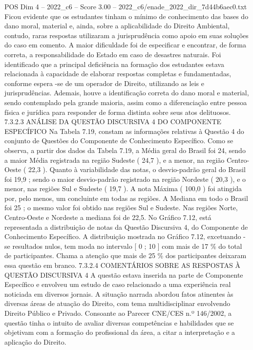 \begin{textsample}{POS Dim 4 – 2022\_c6 – Score 3.00 – 2022\_c6/enade\_2022\_dir\_7d44b6aec0.txt}
Ficou evidente que os estudantes tinham o mínimo de conhecimento das bases do dano moral, material e, ainda, sobre a aplicabilidade do Direito Ambiental, contudo, raras respostas utilizaram a jurisprudência como apoio em suas soluções do caso em comento.
A maior dificuldade foi de especificar e encontrar, de forma correta, a responsabilidade do Estado em caso de desastres naturais.
Foi identificado que a principal deficiência na formação dos estudantes estava relacionada à capacidade de elaborar respostas completas e fundamentadas, conforme espera -se de um operador de Direito, utilizando as leis e jurisprudências.
Ademais, houve a identificação correta do dano moral e material, sendo contemplado pela grande maioria, assim como a diferenciação entre pessoa física e jurídica para responder de forma distinta sobre seus atos delituosos. 7.3.2.3 ANÁLISE DA QUESTÃO DISCURSIVA 4 DO COMPONENTE ESPECÍFICO Na Tabela 7.19, constam as informações relativas à Questão 4 do conjunto de Questões do Componente de Conhecimento Específico.
Como se observa, a partir dos dados da Tabela 7.19, a Média geral do Brasil foi 24, sendo a maior Média registrada na região Sudeste ( 24,7 ), e a menor, na região Centro-Oeste ( 22,3 ).
Quanto à variabilidade das notas, o desvio-padrão geral do Brasil foi 19,9 ; sendo o maior desvio-padrão registrado na região Nordeste ( 20,3 ), e o menor, nas regiões Sul e Sudeste ( 19,7 ).
A nota Máxima ( 100,0 ) foi atingida por, pelo menos, um concluinte em todas as regiões.
A Mediana em todo o Brasil foi 25 ; o mesmo valor foi obtido nas regiões Sul e Sudeste.
Nas regiões Norte, Centro-Oeste e Nordeste a mediana foi de 22,5.
No Gráfico 7.12, está representada a distribuição de notas da Questão Discursiva 4, do Componente de Conhecimento Específico.
A distribuição mostrada no Gráfico 7.12, excetuando -se resultados nulos, tem moda no intervalo [ 0 ; 10 ] com mais de 17 \% do total de participantes.
Chama a atenção que mais de 25 \% dos participantes deixaram essa questão em branco. 7.3.2.4 COMENTÁRIOS SOBRE AS RESPOSTAS À QUESTÃO DISCURSIVA 4 A questão estava inserida na parte de Componente Específico e envolveu um estudo de caso relacionado a uma experiência real noticiada em diversos jornais.
A situação narrada abordou fatos atinentes às diversas áreas de atuação do Direito, com tema multidisciplinar envolvendo Direito Público e Privado.
Consoante ao Parecer CNE/CES n.º 146/2002, a questão tinha o intuito de avaliar diversas competências e habilidades que se objetivam com a formação do profissional da área, a citar a interpretação e a aplicação do Direito.

\end{textsample}
